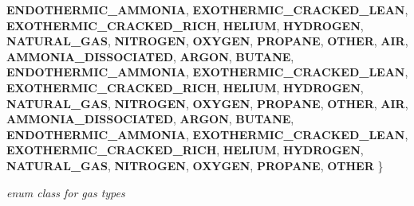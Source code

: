 \begin{DoxyCompactItemize}
\newline
{\bfseries E\+N\+D\+O\+T\+H\+E\+R\+M\+I\+C\+\_\+\+A\+M\+M\+O\+N\+IA}, 
{\bfseries E\+X\+O\+T\+H\+E\+R\+M\+I\+C\+\_\+\+C\+R\+A\+C\+K\+E\+D\+\_\+\+L\+E\+AN}, 
{\bfseries E\+X\+O\+T\+H\+E\+R\+M\+I\+C\+\_\+\+C\+R\+A\+C\+K\+E\+D\+\_\+\+R\+I\+CH}, 
{\bfseries H\+E\+L\+I\+UM}, 
\newline
{\bfseries H\+Y\+D\+R\+O\+G\+EN}, 
{\bfseries N\+A\+T\+U\+R\+A\+L\+\_\+\+G\+AS}, 
{\bfseries N\+I\+T\+R\+O\+G\+EN}, 
{\bfseries O\+X\+Y\+G\+EN}, 
\newline
{\bfseries P\+R\+O\+P\+A\+NE}, 
{\bfseries O\+T\+H\+ER}, 
{\bfseries A\+IR}, 
{\bfseries A\+M\+M\+O\+N\+I\+A\+\_\+\+D\+I\+S\+S\+O\+C\+I\+A\+T\+ED}, 
\newline
{\bfseries A\+R\+G\+ON}, 
{\bfseries B\+U\+T\+A\+NE}, 
{\bfseries E\+N\+D\+O\+T\+H\+E\+R\+M\+I\+C\+\_\+\+A\+M\+M\+O\+N\+IA}, 
{\bfseries E\+X\+O\+T\+H\+E\+R\+M\+I\+C\+\_\+\+C\+R\+A\+C\+K\+E\+D\+\_\+\+L\+E\+AN}, 
\newline
{\bfseries E\+X\+O\+T\+H\+E\+R\+M\+I\+C\+\_\+\+C\+R\+A\+C\+K\+E\+D\+\_\+\+R\+I\+CH}, 
{\bfseries H\+E\+L\+I\+UM}, 
{\bfseries H\+Y\+D\+R\+O\+G\+EN}, 
{\bfseries N\+A\+T\+U\+R\+A\+L\+\_\+\+G\+AS}, 
\newline
{\bfseries N\+I\+T\+R\+O\+G\+EN}, 
{\bfseries O\+X\+Y\+G\+EN}, 
{\bfseries P\+R\+O\+P\+A\+NE}, 
{\bfseries O\+T\+H\+ER}, 
\newline
{\bfseries A\+IR}, 
{\bfseries A\+M\+M\+O\+N\+I\+A\+\_\+\+D\+I\+S\+S\+O\+C\+I\+A\+T\+ED}, 
{\bfseries A\+R\+G\+ON}, 
{\bfseries B\+U\+T\+A\+NE}, 
\newline
{\bfseries E\+N\+D\+O\+T\+H\+E\+R\+M\+I\+C\+\_\+\+A\+M\+M\+O\+N\+IA}, 
{\bfseries E\+X\+O\+T\+H\+E\+R\+M\+I\+C\+\_\+\+C\+R\+A\+C\+K\+E\+D\+\_\+\+L\+E\+AN}, 
{\bfseries E\+X\+O\+T\+H\+E\+R\+M\+I\+C\+\_\+\+C\+R\+A\+C\+K\+E\+D\+\_\+\+R\+I\+CH}, 
{\bfseries H\+E\+L\+I\+UM}, 
\newline
{\bfseries H\+Y\+D\+R\+O\+G\+EN}, 
{\bfseries N\+A\+T\+U\+R\+A\+L\+\_\+\+G\+AS}, 
{\bfseries N\+I\+T\+R\+O\+G\+EN}, 
{\bfseries O\+X\+Y\+G\+EN}, 
\newline
{\bfseries P\+R\+O\+P\+A\+NE}, 
{\bfseries O\+T\+H\+ER}
 \}\begin{DoxyCompactList}\small\item\em enum class for gas types \end{DoxyCompactList}
\item 
\mbox{\label{class_flow_calculations_energy_use_afbabab0da698748de91369a5dfc7662a}} 

\end{DoxyCompactItemize}
